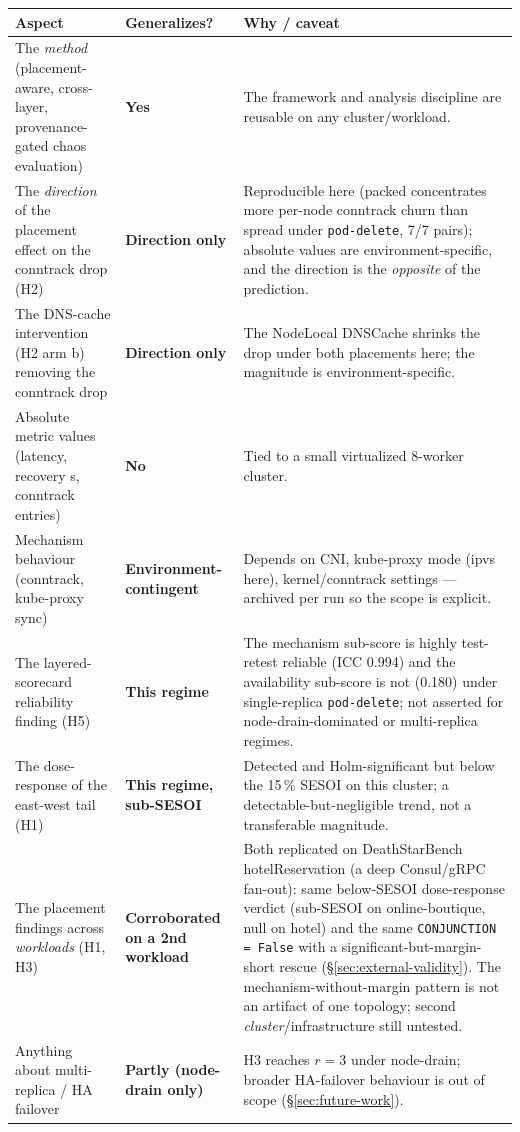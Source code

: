\begin{center}
\footnotesize
\begin{tabular}{p{}p{}p{}}
\toprule
\textbf{Aspect} & \textbf{Generalizes?} & \textbf{Why / caveat} \\
\midrule
The \emph{method} (placement-aware, cross-layer, provenance-gated chaos evaluation) & \textbf{Yes} & The framework and analysis discipline are reusable on any cluster/workload. \\
\addlinespace
The \emph{direction} of the placement effect on the conntrack drop (H2) & \textbf{Direction only} & Reproducible here (packed concentrates more per-node conntrack churn than spread under \texttt{pod-delete}, 7/7 pairs); absolute values are environment-specific, and the direction is the \emph{opposite} of the prediction. \\
\addlinespace
The DNS-cache intervention (H2 arm b) removing the conntrack drop & \textbf{Direction only} & The NodeLocal DNSCache shrinks the drop under both placements here; the magnitude is environment-specific. \\
\addlinespace
Absolute metric values (latency, recovery s, conntrack entries) & \textbf{No} & Tied to a small virtualized 8-worker cluster. \\
\addlinespace
Mechanism behaviour (conntrack, kube-proxy sync) & \textbf{Environment-contingent} & Depends on CNI, kube-proxy mode (ipvs here), kernel/conntrack settings --- archived per run so the scope is explicit. \\
\addlinespace
The layered-scorecard reliability finding (H5) & \textbf{This regime} & The mechanism sub-score is highly test-retest reliable (ICC 0.994) and the availability sub-score is not (0.180) under single-replica \texttt{pod-delete}; not asserted for node-drain-dominated or multi-replica regimes. \\
\addlinespace
The dose-response of the east-west tail (H1) & \textbf{This regime, sub-SESOI} & Detected and Holm-significant but below the 15\,\% SESOI on this cluster; a detectable-but-negligible trend, not a transferable magnitude. \\
\addlinespace
The placement findings across \emph{workloads} (H1, H3) & \textbf{Corroborated on a 2nd workload} & Both replicated on DeathStarBench hotelReservation (a deep Consul/gRPC fan-out): same below-SESOI dose-response verdict (sub-SESOI on online-boutique, null on hotel) and the same \texttt{CONJUNCTION = False} with a significant-but-margin-short rescue (\S\ref{sec:external-validity}). The mechanism-without-margin pattern is not an artifact of one topology; second \emph{cluster}/infrastructure still untested. \\
\addlinespace
Anything about multi-replica / HA failover & \textbf{Partly (node-drain only)} & H3 reaches $r{=}3$ under node-drain; broader HA-failover behaviour is out of scope (\S\ref{sec:future-work}). \\
\bottomrule
\end{tabular}
\end{center}

